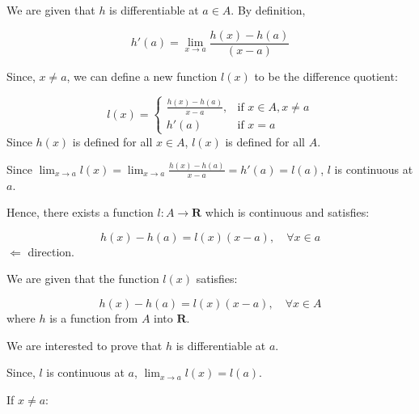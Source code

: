\documentclass[10pt]{article}
\begin{document}
We are given that $\displaystyle h$ is differentiable at $\displaystyle a\in A$. By definition,


\begin{equation*}
h'( a) =\lim _{x\rightarrow a}\frac{h( x) -h( a)}{( x-a)}
\end{equation*}


Since, $\displaystyle x\neq a$, we can define a new function $\displaystyle l( x)$ to be the difference quotient:


\begin{equation*}
l( x) =\begin{cases}
\frac{h( x) -h( a)}{x-a} , & \text{if } x\in A,x\neq a\\
h'( a) & \text{if } x=a
\end{cases}
\end{equation*}
Since $\displaystyle h( x)$ is defined for all $\displaystyle x\in A$, $\displaystyle l( x)$ is defined for all $\displaystyle A$. 



Since $\displaystyle \lim _{x\rightarrow a} l( x) =\lim _{x\rightarrow a}\frac{h( x) -h( a)}{x-a} =h'( a) =l( a)$, $\displaystyle l$ is continuous at $\displaystyle a$.



Hence, there exists a function $\displaystyle l:A\rightarrow \mathbf{R}$ which is continuous and satisfies:


\begin{equation*}
h( x) -h( a) =l( x)( x-a) ,\quad \forall x\in a
\end{equation*}
$\displaystyle \Longleftarrow $ direction.



We are given that the function $\displaystyle l( x)$ satisfies:



\begin{equation*}
h( x) -h( a) =l( x)( x-a) ,\quad \forall x\in A
\end{equation*}where $\displaystyle h$ is a function from $\displaystyle A$ into $\displaystyle \mathbf{R}$. 



We are interested to prove that $\displaystyle h$ is differentiable at $\displaystyle a$. 



Since, $\displaystyle l$ is continuous at $\displaystyle a$, $\displaystyle \lim _{x\rightarrow a} l( x) =l( a)$. 

If $\displaystyle x\neq a$:
\end{document}
